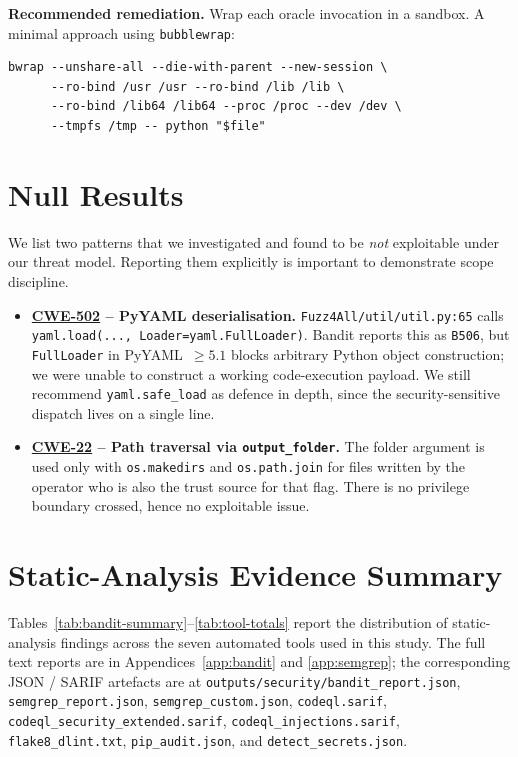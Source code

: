 \documentclass[conference]{IEEEtran}
\newcommand{\cwe}[1]{\href{https://cwe.mitre.org/data/definitions/#1.html}{CWE-#1}}
\begin{document}
\textbf{Recommended remediation.} Wrap each oracle invocation in a
sandbox. A minimal approach using \texttt{bubblewrap}:

\begin{lstlisting}[style=sh,caption={Recommended fix for F3.}]
bwrap --unshare-all --die-with-parent --new-session \
      --ro-bind /usr /usr --ro-bind /lib /lib \
      --ro-bind /lib64 /lib64 --proc /proc --dev /dev \
      --tmpfs /tmp -- python "$file"
\end{lstlisting}

\section{Null Results}
\label{sec:null}

We list two patterns that we investigated and found to be \emph{not}
exploitable under our threat model. Reporting them explicitly is
important to demonstrate scope discipline.

\begin{itemize}[leftmargin=*]
\item \textbf{\cwe{502} -- PyYAML deserialisation.} \texttt{Fuzz4All/util/util.py:65}
calls \verb|yaml.load(..., Loader=yaml.FullLoader)|. Bandit reports this
as \texttt{B506}, but \texttt{FullLoader} in PyYAML~$\geq 5.1$ blocks
arbitrary Python object construction; we were unable to construct a
working code-execution payload. We still recommend \verb|yaml.safe_load|
as defence in depth, since the security-sensitive dispatch lives on a
single line.
\item \textbf{\cwe{22} -- Path traversal via \texttt{output\_folder}.}
The folder argument is used only with \texttt{os.makedirs} and
\texttt{os.path.join} for files written by the operator who is also the
trust source for that flag. There is no privilege boundary crossed,
hence no exploitable issue.
\end{itemize}

\section{Static-Analysis Evidence Summary}
\label{sec:evidence}

Tables~\ref{tab:bandit-summary}--\ref{tab:tool-totals} report the
distribution of static-analysis findings across the seven automated
tools used in this study. The full text reports are in
Appendices~\ref{app:bandit} and \ref{app:semgrep}; the corresponding
JSON / SARIF artefacts are at
\texttt{outputs/security/bandit\_report.json},
\texttt{semgrep\_report.json},
\texttt{semgrep\_custom.json},
\texttt{codeql.sarif},
\texttt{codeql\_security\_extended.sarif},
\texttt{codeql\_injections.sarif},
\texttt{flake8\_dlint.txt},
\texttt{pip\_audit.json}, and
\texttt{detect\_secrets.json}.
\end{document}

